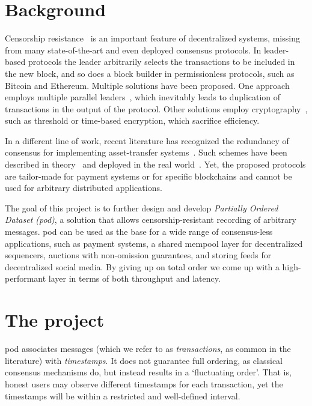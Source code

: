 \section{Background}
Censorship resistance~\cite{DBLP:conf/ccs/KelkarDLJK23,DBLP:conf/nsdi/YangPAKT22,DBLP:journals/corr/abs-2307-10185} is an important feature of decentralized systems,
missing from many state-of-the-art and even deployed consensus protocols.
In leader-based protocols the leader arbitrarily selects the transactions to be included in the new block,
and so does a block builder in permissionless protocols, such as Bitcoin and Ethereum.
Multiple solutions have been proposed.
One approach employs multiple parallel leaders~\cite{DBLP:journals/corr/abs-1906-05552,DBLP:conf/sirocco/AvarikiotiHSVWW23, DBLP:conf/nsdi/YangPAKT22,DBLP:journals/corr/abs-2307-10185,DBLP:conf/ccs/MillerXCSS16,DBLP:conf/eurosys/DanezisKSS22}, which inevitably leads to duplication of transactions in the output of the protocol.
Other solutions employ cryptography~\cite{DBLP:conf/ccs/MillerXCSS16, DBLP:conf/aft/ZhangMQBEF23, DBLP:conf/crypto/CachinKPS01,Malkhi2022MaximalEV}, such as threshold or time-based encryption, which sacrifice efficiency.

In a different line of work, recent literature has recognized the redundancy of consensus for implementing asset-transfer systems~\cite{DBLP:journals/dc/GuerraouiKMPS22}.
Such schemes have been described in theory~\cite{DBLP:journals/corr/abs-1909-10926, DBLP:conf/dsn/CollinsGKKMPPST20} and deployed in the real world~\cite{DBLP:conf/aft/BaudetDS20}.
Yet, the proposed protocols are tailor-made for payment systems or for specific blockchains and cannot  be used for arbitrary distributed applications.

The goal of this project is to further design and develop \emph{Partially Ordered Dataset (pod)},
a solution that allows censorship-resistant recording of arbitrary messages.
pod can be used as the base for a wide range of consensus-less applications,
such as payment systems,
a shared mempool layer for decentralized sequencers,
auctions with non-omission guarantees, and storing feeds for decentralized social media.
By giving up on total order we come up with a high-performant layer in terms of both throughput and latency.

\section{The project}
pod associates messages (which we refer to as \emph{transactions}, as common in the literature) with \emph{timestamps}.
It does not guarantee full ordering, as classical consensus mechanisms do, but instead results in a `fluctuating order'.
That is, honest users may observe different timestamps for each transaction, yet the timestamps will be within a restricted and well-defined interval.

